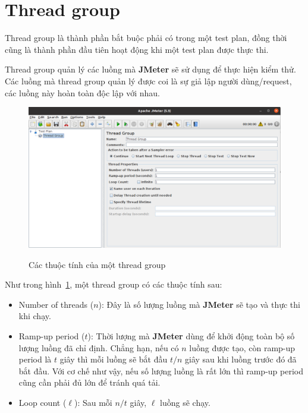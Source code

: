 \documentclass[10pt]{report}
\newcommand{\jmeter}{\textbf{JMeter}}
\begin{document}
\section{Thread group}

\par Thread group là thành phần bắt buộc phải có trong một test plan, đồng thời cũng là thành phần đầu tiên hoạt động khi một test plan được thực thi.

\par Thread group quản lý các luồng mà \jmeter{} sẽ sử dụng để thực hiện kiểm thử. Các luồng mà thread group quản lý được coi là sự giả lập người dùng/request, các luồng này hoàn toàn độc lập với nhau.

\FloatBarrier{}
\begin{figure}[htp]
    \centering
    \includegraphics[scale=0.3]{thread_group.png}
    \caption{Các thuộc tính của một thread group}
    {\label{fig:thread-group}}
\end{figure}
\FloatBarrier{}

\par Như trong hình~\ref{fig:thread-group}, một thread group có các thuộc tính sau:
\begin{itemize}
    \item Number of threads ($n$): Đây là số lượng luồng mà \jmeter{} sẽ tạo và thực thi khi chạy.
    \item Ramp-up period ($t$): Thời lượng mà \jmeter{} dùng để khởi động toàn bộ số lượng luồng đã chỉ định. Chẳng hạn, nếu có $n$ luồng được tạo, còn ramp-up period là $t$ giây thì mỗi luồng sẽ bắt đầu $t/n$ giây sau khi luồng trước đó đã bắt đầu. Với cơ chế như vậy, nếu số lượng luồng là rất lớn thì ramp-up period cũng cần phải đủ lớn để tránh quá tải.
    \item Loop count ($\ell$): Sau mỗi $n/t$ giây, $\ell$ luồng sẽ chạy.
\end{itemize}
\end{document}

